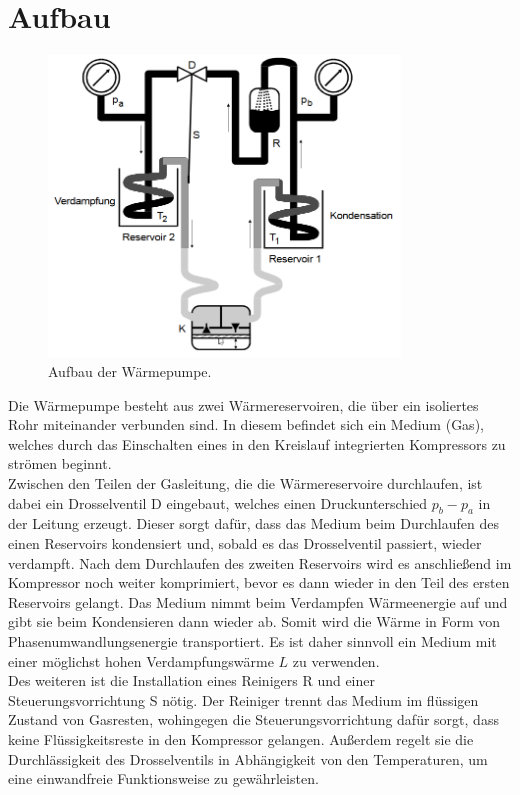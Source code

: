 \section{Aufbau}

\begin{figure}[H]
  \centering
  \includegraphics[height=8cm]{Waermepumpe.PNG}
  \caption{Aufbau der Wärmepumpe.\cite{sample}}
  \label{fig:plot}
\end{figure}

Die Wärmepumpe besteht aus zwei Wärmereservoiren, die über ein isoliertes
Rohr miteinander verbunden sind. In diesem befindet sich ein Medium (Gas), welches
durch das Einschalten eines in den Kreislauf integrierten Kompressors zu strömen
beginnt.\\
Zwischen den Teilen der Gasleitung, die die Wärmereservoire durchlaufen,
ist dabei ein Drosselventil D eingebaut, welches einen Druckunterschied $p_b-p_a$
in der Leitung erzeugt. Dieser sorgt dafür, dass das Medium beim Durchlaufen
des einen Reservoirs kondensiert und, sobald es das Drosselventil passiert,
wieder verdampft. Nach dem Durchlaufen des zweiten Reservoirs wird es anschließend im Kompressor noch
weiter komprimiert, bevor es dann wieder in den Teil des ersten Reservoirs gelangt.
Das Medium nimmt beim Verdampfen Wärmeenergie auf und gibt sie beim Kondensieren
dann wieder ab. Somit wird die Wärme in Form von Phasenumwandlungsenergie transportiert.
Es ist daher sinnvoll ein Medium mit einer möglichst hohen Verdampfungswärme $L$
zu verwenden.\\
Des weiteren ist die Installation eines Reinigers R und einer Steuerungsvorrichtung
S nötig. Der Reiniger trennt das Medium im flüssigen Zustand von Gasresten, wohingegen
die Steuerungsvorrichtung dafür sorgt, dass keine Flüssigkeitsreste in den Kompressor
gelangen. Außerdem regelt sie die Durchlässigkeit des Drosselventils in Abhängigkeit
von den Temperaturen, um eine einwandfreie Funktionsweise zu gewährleisten.

\label{sec:Aufbau}
